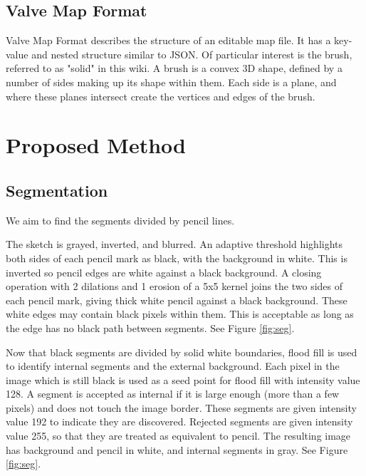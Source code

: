 \documentclass{IEEEtran}
\begin{document}
\subsection{Valve Map Format}

Valve Map Format \cite{valve2006vmf} describes the structure of an editable map file. It has a key-value and nested structure similar to JSON. Of particular interest is the brush, referred to as "solid" in this wiki. A brush is a convex 3D shape, defined by a number of sides making up its shape within them. Each side is a plane, and where these planes intersect create the vertices and edges of the brush.

\section{Proposed Method}
\subsection{Segmentation}
We aim to find the segments divided by pencil lines.

The sketch is grayed, inverted, and blurred. An adaptive threshold highlights both sides of each pencil mark as black, with the background in white. This is inverted so pencil edges are white against a black background. A closing operation with 2 dilations and 1 erosion of a 5x5 kernel joins the two sides of each pencil mark, giving thick white pencil against a black background. These white edges may contain black pixels within them. This is acceptable as long as the edge has no black path between segments. See Figure \ref{fig:seg}.

Now that black segments are divided by solid white boundaries, flood fill is used to identify internal segments and the external background. Each pixel in the image which is still black is used as a seed point for flood fill with intensity value 128. A segment is accepted as internal if it is large enough (more than a few pixels) and does not touch the image border. These segments are given intensity value 192 to indicate they are discovered. Rejected segments are given intensity value 255, so that they are treated as equivalent to pencil. The resulting image has background and pencil in white, and internal segments in gray. See Figure \ref{fig:seg}.
\end{document}
